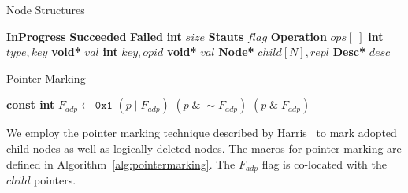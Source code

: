 \documentclass[10pt,conference,compsocconf]{IEEEtran}
\begin{document}
\begin{algorithm}[h]
    \caption{Node Structures}
    \label{alg:nodestructure}
    \vspace{-0.2in}
    \begin{multicols}{2}
        \begin{algorithmic}[1]
            \State \textbf{InProgress}
            \State \textbf{Succeeded}
            \State \textbf{Failed}
            \EndEnum
            \State \textbf{int} $size$
            \State \textbf{Stauts} $flag$
            \State \textbf{Operation} $ops[\;]$
            \EndStruct
            \State \textbf{int} $type,key$
            \State \textbf{void*} $val$
            \EndStruct
            \State \textbf{int} $key,opid$
            \State \textbf{void*} $val$
            \State \textbf{Node*} $child[N],repl$
            \State \textbf{Desc*} $desc$
            \EndStruct
            \end{algorithmic}
    \end{multicols}
    \vspace{-0.15in}
\end{algorithm}

\begin{algorithm}[h]
    \caption{Pointer Marking}
    \label{alg:pointermarking}
    \begin{algorithmic}[1]
        \State \textbf{const int} $F_{adp} \gets \texttt{0x1}$
         $(p\;|\;F_{adp})$
        \EndDefine
         $(p\;\&\;\sim F_{adp})$
        \EndDefine
         $(p\;\&\;F_{adp})$
        \EndDefine
    \end{algorithmic}
\end{algorithm}

We employ the pointer marking technique described by Harris~\cite{harris2001pragmatic} to mark adopted child nodes as well as logically deleted nodes. 
The macros for pointer marking are defined in Algorithm~\ref{alg:pointermarking}.
The $F_{adp}$ flag is co-located with the $child$ pointers.
\end{document}
